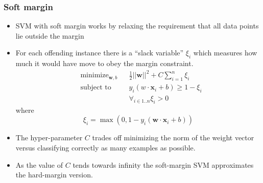 \documentclass{beamer}
\newcommand{\vecb}[1]{\mathbf{#1}}
\newcommand{\x}{\mathbf{x}}
\begin{document}
\begin{frame}
 \frametitle{Soft margin}
\begin{itemize}
\item SVM with soft margin works by relaxing the requirement that all
  data points lie outside the margin
\item For each offending instance there is a ``slack variable''
  $\xi_i$ which measures how much it would have move to obey the
  margin constraint.
\begin{equation}
\begin{aligned}
 & \text{minimize}_{\vecb{w},b} & & \frac{1}{2}||\vecb{w}||^2 + C \sum_{i=1}^n\xi_i\\
 & \text{subject to}            & & y_i(w\cdot \x_i + b) \geq 1 - \xi_i\\
 &			        & & \forall_{i \in 1..n} \xi_i > 0
\end{aligned}
\end{equation}
where 
\begin{equation*}
 \xi_i = \max(0,1-y_i(\vecb{w}\cdot\x_i+b))
\end{equation*}

\item The hyper-parameter $C$ trades off minimizing the norm of the
  weight vector versus classifying correctly as many examples as
  possible.
\item As the value of $C$ tends towards infinity the soft-margin SVM
  approximates the hard-margin version.
\end{itemize}
\end{frame}
\end{document}
